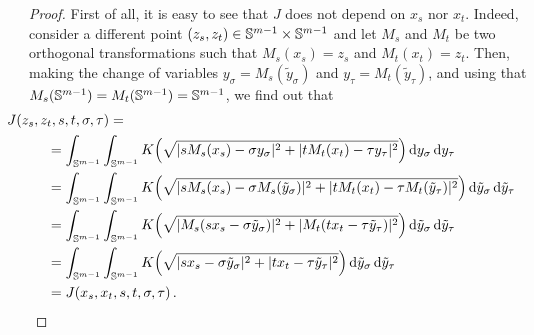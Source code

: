 \begin{proof}
First of all, it is easy to see that $J$ does not depend on $x_s$ nor $x_t$. Indeed, consider a
different point $(z_s, z_t)\in \mathbb{S}^{m-1} \times \mathbb{S}^{m-1}$ and let $M_s$ and $M_t$ be two
orthogonal transformations such that $M_s(x_s) = z_s$ and $M_t(x_t) = z_t$. Then, making the change
of variables $y_\sigma = M_s(\tilde{y}_\sigma)$ and $y_\tau = M_t(\tilde{y}_\tau)$, and using that
$M_s( \mathbb{S}^{m-1}) = M_t(\mathbb{S}^{m-1}) = \mathbb{S}^{m-1}$, we find out that
\begin{align*}
& \hspace{-1cm} J(z_s, z_t, s,t,\sigma, \tau) = \\
&= \int_{\Sph^{m-1}}  \int_{\Sph^{m-1}} K \Big( \sqrt{|s M_s(x_s) - \sigma y_\sigma|^2 + |t M_t(x_t) - \tau y_\tau|^2 }\Big) \d y_\sigma \d y_\tau \\
&= \int_{\Sph^{m-1}}  \int_{\Sph^{m-1}} K \Big( \sqrt{|s M_s(x_s) - \sigma M_s(\tilde{y}_\sigma)|^2 + |t M_t(x_t) - \tau M_t(\tilde{y}_\tau)|^2 }\Big) \d \tilde{y}_\sigma \d \tilde{y}_\tau \\
&= \int_{\Sph^{m-1}}  \int_{\Sph^{m-1}} K\Big ( \sqrt{|M_s(sx_s - \sigma \tilde{y}_\sigma)|^2 + |M_t(t x_t - \tau \tilde{y}_\tau)|^2 }\Big) \d \tilde{y}_\sigma \d \tilde{y}_\tau \\
&= \int_{\Sph^{m-1}}  \int_{\Sph^{m-1}} K\Big ( \sqrt{|sx_s - \sigma \tilde{y}_\sigma|^2 + |t x_t - \tau \tilde{y}_\tau|^2 }\Big) \d \tilde{y}_\sigma \d \tilde{y}_\tau \\
&= J(x_s, x_t, s,t,\sigma, \tau) \,.
\end{align*}


\end{proof}

